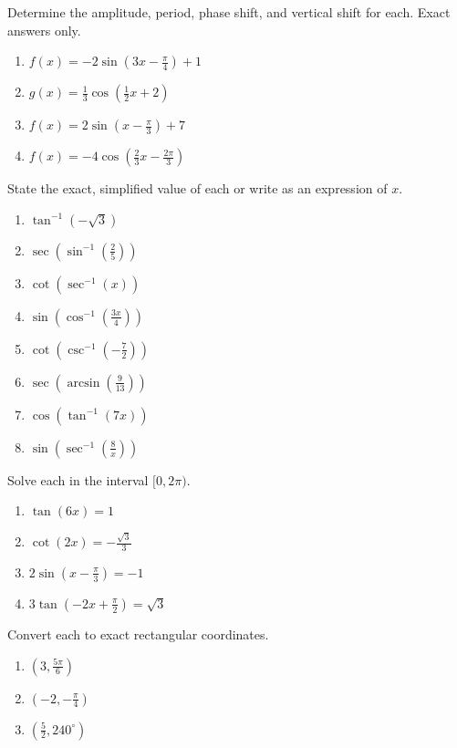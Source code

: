 \documentclass{article}
\newcounter{Review}
\begin{document}
Determine the amplitude, period, phase shift, and vertical shift for each. Exact answers only.

\begin{enumerate}   \setcounter{enumi}{\value{Review}}
	\item $f(x) = -2\sin\left(3x-\frac{\pi}{4}\right) + 1$
	\item $g(x) = \frac{1}{3}\cos\left(\frac{1}{2}x + 2\right)$
	\item $f(x)=2\sin\left(x-\frac{\pi}{3}\right)+7$
	\item $f(x)=-4\cos\left(\frac{2}{3}x-\frac{2\pi}{3}\right)$
\end{enumerate}
\setcounter{Review}{\value{enumi}}

State the exact, simplified value of each or write as an expression of $x$.

\begin{enumerate}   \setcounter{enumi}{\value{Review}}
	\item $\tan^{-1}\left(-\sqrt{3}\right)$
	\item $\sec\left(\sin^{-1}\left(\frac{2}{5}\right)\right)$
	\item $\cot\left(\sec^{-1}(x)\right)$
	\item $\sin\left(\cos^{-1}\left(\frac{3x}{4}\right)\right)$
	\item $\cot\left(\csc^{-1}\left(-\frac{7}{2}\right)\right)$
	\item $\sec\left(\arcsin\left(\frac{9}{13}\right)\right)$
	\item $\cos\left(\tan^{-1}(7x)\right)$
	\item $\sin\left(\sec^{-1}\left(\frac{8}{x}\right)\right)$
\end{enumerate}
\setcounter{Review}{\value{enumi}}

Solve each in the interval $[0,2\pi)$.

\begin{enumerate}   \setcounter{enumi}{\value{Review}}
	\item $\tan(6x) = 1$
    \item $\cot(2x) = -\frac{\sqrt{3}}{3}$
    \item $2\sin\left(x-\frac{\pi}{3}\right) = -1$
    \item $3\tan\left(-2x+\frac{\pi}{2}\right)=\sqrt{3}$
\end{enumerate}
\setcounter{Review}{\value{enumi}}

Convert each to exact rectangular coordinates.
\begin{enumerate}   \setcounter{enumi}{\value{Review}}
	\item $\left(3, \frac{5\pi}{6}\right)$
    \item $\left(-2, -\frac{\pi}{4}\right)$
    \item $\left(\frac{5}{2}, 240^\circ\right)$
\end{enumerate}	\setcounter{Review}{\value{enumi}}
\end{document}

